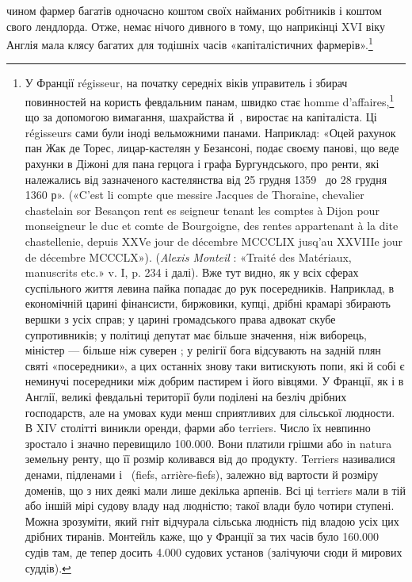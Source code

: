 чином фармер багатів одночасно коштом своїх найманих
робітників і коштом свого лендлорда. Отже, немає нічого дивного
в тому, що наприкінці XVI віку Англія мала клясу багатих
для тодішніх часів «капіталістичних фармерів».\footnote{
У Франції régisseur, на початку середніх віків управитель і збирач
повинностей на користь февдальним панам, швидко стає homme
d’affaires,\footnote*{
— ділком. \emph{Ред.}
} що за допомогою вимагання, шахрайства й~, виростає
на капіталіста. Ці régisseurs сами були іноді вельможними панами. Наприклад:
«Оцей рахунок пан Жак де Торес, лицар-кастелян у
Безансоні, подає своєму панові, що веде рахунки в Діжоні для пана
герцога і графа Бургундського, про ренти, які належались від зазначеного
кастелянства від 25 грудня 1359~ до 28 грудня 1360 р». («C’est
li compte que messire Jacques de Thoraine, chevalier chastelain sor Besançon
rent es seigneur tenant les comptes à Dijon pour monseigneur le
duc et comte de Bourgoigne, des rentes appartenant à la dite chastellenie,
depuis XXVe jour de décembre MCCCLIX jusq’au XXVIIIe jour de décembre
MCCCLX»). (\emph{Alexis Monteil} : «Traité des Matériaux, manuscrits etc.» v. I,
p. 234 і далі). Вже тут видно, як у всіх сферах суспільного життя левина
пайка попадає до рук посередників. Наприклад, в економічній царині фінансисти,
биржовики, купці, дрібні крамарі збирають вершки з усіх справ;
у царині громадського права адвокат скубе супротивників; у політиці
депутат має більше значення, ніж виборець, міністер — більше ніж суверен
; у релігії бога відсувають на задній плян святі «посередники», а цих
останніх знову таки витискують попи, які й собі є неминучі посередники
між добрим пастирем і його вівцями. У Франції, як і в Англії, великі
февдальні території були поділені на безліч дрібних господарств, але
на умовах куди менш сприятливих для сільської людности. В XIV столітті
виникли оренди, фарми або terriers. Число їх невпинно зростало і
значно перевищило \num{100.000}. Вони платили грішми або in natura земельну
ренту, що її розмір коливався від  до  продукту. Terriers називалися
денами, підленами і~ (fiefs, arrière-fiefs), залежно від вартости й
розміру доменів, що з них деякі мали лише декілька арпенів. Всі ці
terriers мали в тій або іншій мірі судову владу над людністю; такої влади
було чотири ступені. Можна зрозуміти, який гніт відчурала сільська
людність під владою усіх цих дрібних тиранів. Монтейль каже, що у Франції
за тих часів було \num{160.000} судів там, де тепер досить \num{4.000} судових установ
(залічуючи сюди й мирових суддів).
}

